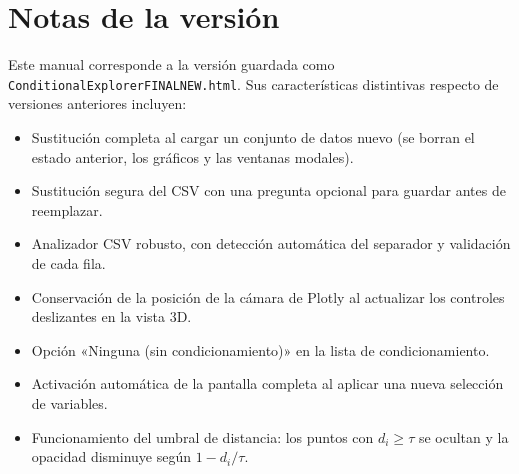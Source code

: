 \documentclass[11pt,a4paper]{article}
\begin{document}
\section*{Notas de la versión}

Este manual corresponde a la versión guardada como \texttt{ConditionalExplorerFINALNEW.html}. Sus características distintivas respecto de versiones anteriores incluyen:

\begin{itemize}[leftmargin=1.4em]
  \item Sustitución completa al cargar un conjunto de datos nuevo (se borran el estado anterior, los gráficos y las ventanas modales).
  \item Sustitución segura del CSV con una pregunta opcional para guardar antes de reemplazar.
  \item Analizador CSV robusto, con detección automática del separador y validación de cada fila.
  \item Conservación de la posición de la cámara de Plotly al actualizar los controles deslizantes en la vista 3D.
  \item Opción «Ninguna (sin condicionamiento)» en la lista de condicionamiento.
  \item Activación automática de la pantalla completa al aplicar una nueva selección de variables.
  \item Funcionamiento del umbral de distancia: los puntos con $d_i \ge \tau$ se ocultan y la opacidad disminuye según $1 - d_i/\tau$.
\end{itemize}
\end{document}
